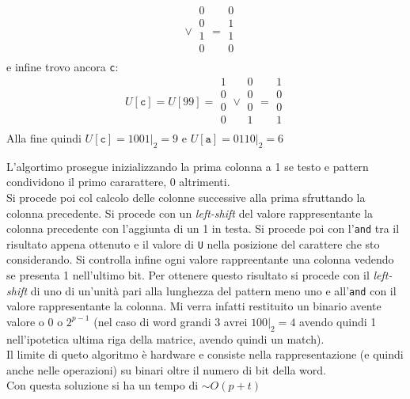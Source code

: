 \documentclass[a4paper,12pt, oneside]{article}
\begin{document}
\begin{esempio}
\[\begin{matrix}
    \end{matrix}\vee
    \begin{matrix}
      0\\
      0\\
      1\\
      0\\
    \end{matrix}=
    \begin{matrix}
      0\\
      1\\
      1\\
      0\\
    \end{matrix}
  \]
  e infine trovo ancora \texttt{c}:
  \[
    U[\mathtt{c}]=U[99]=
    \begin{matrix}
      1\\
      0\\
      0\\
      0\\
    \end{matrix}\vee
    \begin{matrix}
      0\\
      0\\
      0\\
      1\\
    \end{matrix}=
    \begin{matrix}
      1\\
      0\\
      0\\
      1\\
    \end{matrix}
  \]
  Alla fine quindi $U[\mathtt{c}]=1001|_2=9$ e $U[\mathtt{a}]=0110|_2=6$
\end{esempio}
L'algortimo prosegue inizializzando la prima colonna a 1 se testo e
pattern condividono il primo cararattere, 0 altrimenti.\\
Si procede poi col calcolo delle colonne successive alla prima
sfruttando la colonna precedente. Si procede con un
\textit{left-shift} del valore rappresentante la colonna precedente
con l'aggiunta di un 1 in testa. Si procede poi con l'\texttt{and} tra
il risultato appena ottenuto e il valore di \texttt{U} nella posizione
del carattere che sto considerando. Si controlla infine ogni valore
rappreentante una colonna vedendo se presenta 1 nell'ultimo bit. Per
ottenere questo risultato si procede con il \textit{left-shift} di uno
di un'unità pari alla lunghezza del pattern meno uno e
all'\texttt{and} con il valore rappresentante la colonna. Mi verra
infatti restituito un binario avente valore o 0 o $2^{p-1}$ (nel caso di
word grandi 3 avrei $100|_2=4$ avendo quindi 1 nell'ipotetica ultima
riga della matrice, avendo quindi un match).\\
Il limite di queto algoritmo è hardware e consiste nella
rappresentazione (e quindi anche nelle operazioni) su binari oltre il
numero di bit della word.\\
Con questa soluzione si ha un tempo di $\sim O(p + t)$
\end{document}
